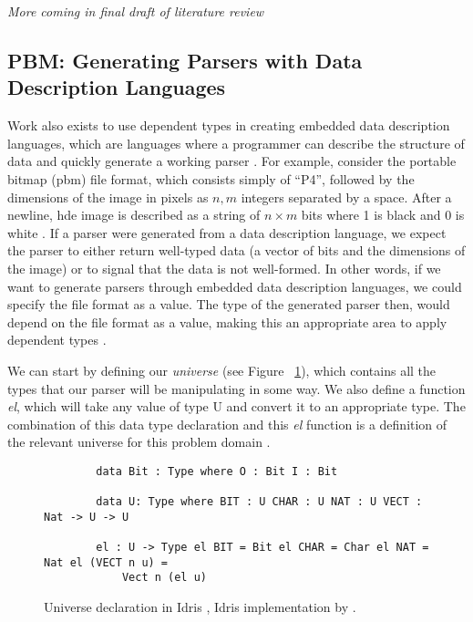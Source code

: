 \textit{More coming in final draft of literature review}

\subsection{PBM: Generating Parsers with Data Description Languages}

Work also exists to use dependent types in creating embedded data description
languages, which are languages where a programmer can describe the structure of
data and quickly generate a working parser \cite{power_of_pi}.  For example,
consider the portable bitmap (pbm) file format, which consists simply of ``P4'',
followed by the dimensions of the image in pixels as $n, m$ integers separated
by a space. After a newline, hde image is described as a string of $n\times m $
bits where 1 is black and 0 is white \cite{pmb_spec}. If a parser were generated
from a data description language, we expect the parser to either return
well-typed data (a vector of bits and the dimensions of the image) or to signal
that the data is not well-formed. In other words, if we want to generate parsers
through embedded data description languages, we could specify the file format as
a value. The type of the generated parser then, would depend on the file format
as a value, making this an appropriate area to apply dependent types
\cite{power_of_pi}. 

We can start by defining our \textit{universe} (see Figure ~\ref{universe}),
which contains all the types that our parser will be manipulating in some way.
We also define a function \textit{el}, which will take any value of type U and
convert it to an appropriate type. The combination of this data type declaration
and this \textit{el} function is a definition of the relevant universe for this
problem domain \cite{power_of_pi}. 

\begin{figure}
    \caption{Universe declaration in Idris \cite{power_of_pi}, Idris
    implementation by \cite{idris_pop}.}
    \label{universe}
    \begin{lstlisting}
        data Bit : Type where O : Bit I : Bit

        data U: Type where BIT : U CHAR : U NAT : U VECT : Nat -> U -> U
        
        el : U -> Type el BIT = Bit el CHAR = Char el NAT = Nat el (VECT n u) =
            Vect n (el u) 
    \end{lstlisting}
\end{figure}

